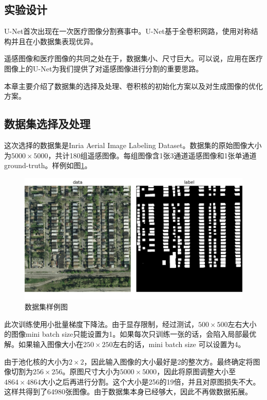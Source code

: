 \begin{spacing}{2}
    \section{实验设计}
\end{spacing}
U-Net首次出现在一次医疗图像分割赛事中。U-Net基于全卷积网路，使用对称结构并且在小数据集表现优异。

遥感图像和医疗图像的共同之处在于，数据集小、尺寸巨大。可以说，应用在医疗图像上的U-Net为我们提供了对遥感图像进行分割的重要思路。

本章主要介绍了数据集的选择及处理、卷积核的初始化方案以及对生成图像的优化方案。

\subsection{数据集选择及处理}
这次选择的数据集是Inria Aerial Image Labeling Dataset\cite{maggiori2017dataset}。数据集的原始图像大小为$5000\times 5000$，共计180组遥感图像。每组图像含1张3通道遥感图像和1张单通道ground-truth。样例如图\ref{Fig:sample_dataset}。

\begin{figure}[htbp]
    \centering
    \includegraphics[width=1\textwidth]{Figures/sample_dataset.png}
    \caption{数据集样例图}
    \label{Fig:sample_dataset}
    
\end{figure}

此次训练使用小批量梯度下降法。由于显存限制，经过测试，$500\times 500$左右大小的图像mini batch size只能设置为1。如果每次只训练一张的话，会陷入局部最优解。如果输入图像大小在$250\times 250$左右的话，mini batch size 可以设置为4。

由于池化核的大小为$2\times 2$，因此输入图像的大小最好是2的整次方。最终确定将图像切割为$256\times 256$。原图尺寸大小为$5000\times 5000$，因此将原图调整大小至$4864\times 4864$大小之后再进行分割。这个大小是256的19倍，并且对原图损失不大。这样共得到了64980张图像。由于数据集本身已经够大，因此不再做数据拓展。

